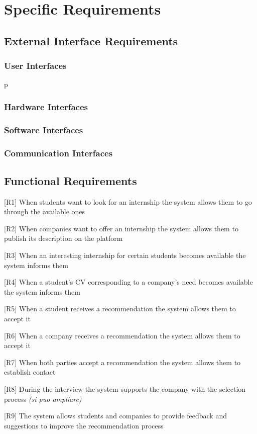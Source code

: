 \chapter{Specific Requirements}

\section{External Interface Requirements}
\subsection{User Interfaces}
p
\subsection{Hardware Interfaces}
\subsection{Software Interfaces}
\subsection{Communication Interfaces}

\section{Functional Requirements}
[R1] When students want to look for an internship the system allows them to go through the available ones

[R2] When companies want to offer an internship the system allows them to publish its description on the platform

[R3] When an interesting internship for certain students becomes available the system informs them

[R4] When a student's CV corresponding to a company's need becomes available the system informs them

[R5] When a student receives a recommendation the system allows them to accept it 

[R6] When a company receives a recommendation the system allows them to accept it 

[R7] When both parties accept a recommendation the system allows them to establish contact

[R8] During the interview the system supports the company with the selection process \textit{(si puo ampliare)}

[R9] The system allows students and companies to provide feedback and suggestions to improve the recommendation process

